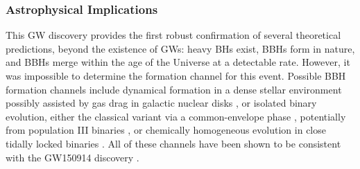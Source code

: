 \documentclass[binding=0.6cm, LaM]{sapthesis}
\begin{document}
	\subsubsection{Astrophysical Implications}
	This GW discovery provides the first robust confirmation of several theoretical predictions, beyond the existence of GWs:
	heavy BHs exist, BBHs form in nature, and BBHs merge within the age of the Universe at a detectable rate. 
	However, it was impossible to determine the formation channel for this event. 
	Possible BBH formation channels include dynamical formation in a dense stellar environment \cite{84, 88} 
	possibly assisted by gas drag in galactic nuclear disks \cite{82, 83}, or isolated binary evolution, 
	either the classical variant via a common-envelope phase \cite{76-81}, 
	potentially from population III binaries \cite{74, 75}, or chemically homogeneous evolution 
	in close tidally locked binaries \cite{72, 73}. 
	All of these channels have been shown to be consistent with the GW150914 discovery \cite{63-70}. 
\end{document}
